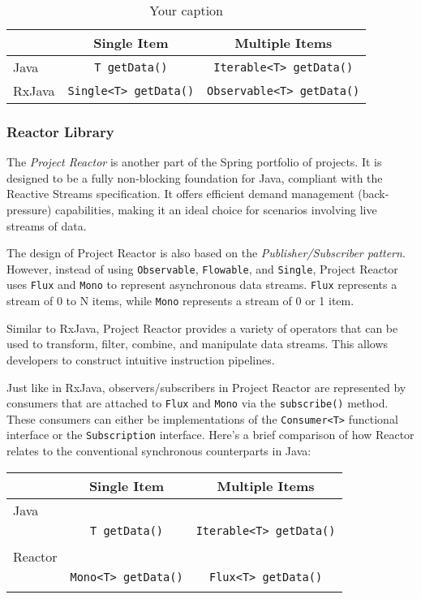 \begin{table}[h]
	\centering
	\begin{tabular}{|l|c|c|}
	\hline
	& Single Item & Multiple Items \\ 
	\hline
	Java & \texttt{T getData()} & \texttt{Iterable<T> getData()} \\ 
	\hline
	RxJava & \texttt{Single<T> getData()} & \texttt{Observable<T> getData()} \\ 
	\hline
	\end{tabular}
	\caption{Your caption}
	\label{tab:my_label}
\end{table}


\subsubsection{Reactor Library}
\label{sec:reactor_architecture}

The \textit{Project Reactor} is another part of the Spring portfolio of projects. It is designed to be a fully non-blocking foundation for Java, compliant with the Reactive Streams specification. It offers efficient demand management (back-pressure) capabilities, making it an ideal choice for scenarios involving live streams of data.

The design of Project Reactor is also based on the \textit{Publisher/Subscriber pattern}. However, instead of using \texttt{Observable}, \texttt{Flowable}, and \texttt{Single}, Project Reactor uses \texttt{Flux} and \texttt{Mono} to represent asynchronous data streams. \texttt{Flux} represents a stream of 0 to N items, while \texttt{Mono} represents a stream of 0 or 1 item.

Similar to RxJava, Project Reactor provides a variety of operators that can be used to transform, filter, combine, and manipulate data streams. This allows developers to construct intuitive instruction pipelines. 

Just like in RxJava, observers/subscribers in Project Reactor are represented by consumers that are attached to \texttt{Flux} and \texttt{Mono} via the \texttt{subscribe()} method. These consumers can either be implementations of the \texttt{Consumer<T>} functional interface or the \texttt{Subscription} interface. 
Here's a brief comparison of how Reactor relates to the conventional synchronous counterparts in Java:

\begin{center}
\begin{tabular}{ |l|c|c| }
\hline
    & Single Item & Multiple Items \\ \hline
    Java & & \\ 
    & \texttt{T getData()}  & \texttt{Iterable<T> getData()} \\
    & & \\
    \hline
    Reactor & & \\ 
    & \texttt{Mono<T> getData()} & \texttt{Flux<T> getData()} \\
    & & \\
    \hline
\end{tabular}
\end{center}

